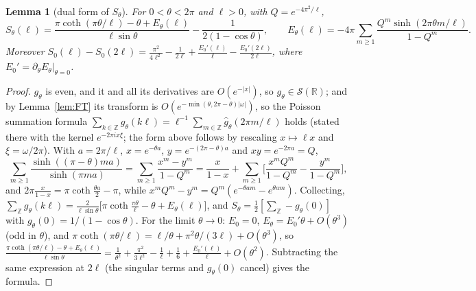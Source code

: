 \documentclass[11pt]{article}
\newtheorem{lemma}[theorem]{Lemma}
\theoremstyle{definition}
\theoremstyle{remark}
\begin{document}
\begin{lemma}[dual form of $S_\theta$]\label{lem:Sdual}
For $0<\theta<2\pi$ and $\ell>0$, with $Q=e^{-4\pi^2/\ell}$,
\[
S_\theta(\ell)=\frac{\pi\coth(\pi\theta/\ell)-\theta+E_\theta(\ell)}{\ell\sin\theta}-\frac1{2(1-\cos\theta)},\qquad
E_\theta(\ell)=-4\pi\sum_{m\ge1}\frac{Q^m\sinh(2\pi\theta m/\ell)}{1-Q^m}.
\]
Moreover $S_0(\ell)-S_0(2\ell)=\frac{\pi^2}{4\ell^2}-\frac1{2\ell}+\frac{E_0'(\ell)}\ell-\frac{E_0'(2\ell)}{2\ell}$, where $E_0'=\partial_\theta E_\theta|_{\theta=0}$.
\end{lemma}
\begin{proof}
$g_\theta$ is even, and it and all its derivatives are $O(e^{-|x|})$, so $g_\theta\in\mathcal S(\mathbb R)$; and by Lemma~\ref{lem:FT} its transform is $O(e^{-\min(\theta,2\pi-\theta)|\omega|})$, so the
Poisson summation formula $\sum_{k\in\mathbb Z}g_\theta(k\ell)=\ell^{-1}\sum_{m\in\mathbb Z}\hat g_\theta(2\pi m/\ell)$ holds
\cite[Ch.~5, \S3]{SteinShakarchi2003} (stated there with the kernel $e^{-2\pi ix\xi}$; the form above follows by rescaling $x\mapsto\ell x$ and $\xi=\omega/2\pi$). With $a=2\pi/\ell$, $x=e^{-\theta a}$, $y=e^{-(2\pi-\theta)a}$ and $xy=e^{-2\pi a}=Q$,
\[
\sum_{m\ge1}\frac{\sinh((\pi-\theta)ma)}{\sinh(\pi ma)}=\sum_{m\ge1}\frac{x^m-y^m}{1-Q^m}
=\frac x{1-x}+\sum_{m\ge1}\Big[\frac{x^mQ^m}{1-Q^m}-\frac{y^m}{1-Q^m}\Big],
\]
and $2\pi\frac x{1-x}=\pi\coth\frac{\theta a}2-\pi$, while $x^mQ^m-y^m=Q^m(e^{-\theta am}-e^{\theta am})$. Collecting,
$\sum_{\mathbb Z}g_\theta(k\ell)=\frac{2}{\ell\sin\theta}\big[\pi\coth\frac{\pi\theta}\ell-\theta+E_\theta(\ell)\big]$, and
$S_\theta=\frac12[\sum_{\mathbb Z}-g_\theta(0)]$ with $g_\theta(0)=1/(1-\cos\theta)$. For the limit $\theta\to0$: $E_0=0$, $E_\theta=E_0'\theta+O(\theta^3)$
(odd in $\theta$), and $\pi\coth(\pi\theta/\ell)=\ell/\theta+\pi^2\theta/(3\ell)+O(\theta^3)$, so
$\frac{\pi\coth(\pi\theta/\ell)-\theta+E_\theta(\ell)}{\ell\sin\theta}=\frac1{\theta^2}+\frac{\pi^2}{3\ell^2}-\frac1\ell+\frac16+\frac{E_0'(\ell)}\ell+O(\theta^2)$. Subtracting
the same expression at $2\ell$ (the singular terms and $g_\theta(0)$ cancel) gives the formula.
\end{proof}
\end{document}
